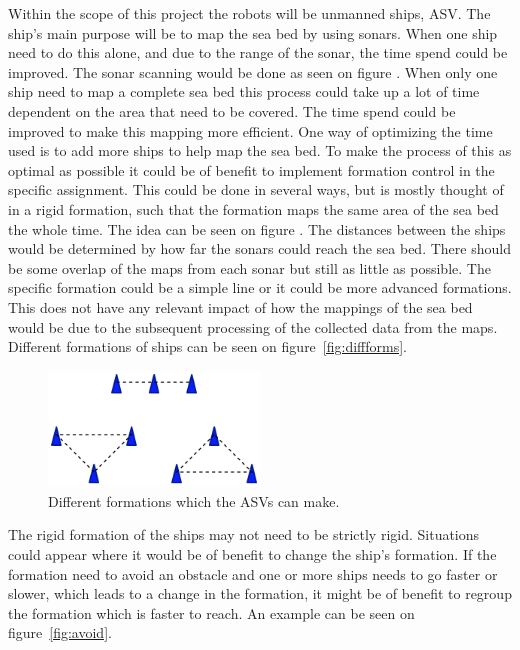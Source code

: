 Within the scope of this project the robots will be unmanned ships, \ac{ASV}. The ship's main purpose will be to map the sea bed by using sonars. When one ship need to do this alone, and due to the range of the sonar, the time spend could be improved. The sonar scanning would be done as seen on figure . When only one ship need to map a complete sea bed this process could take up a lot of time dependent on the area that need to be covered. The time spend could be improved to make this mapping more efficient. One way of optimizing the time used is to add more ships to help map the sea bed. To make the process of this as optimal as possible it could be of benefit to implement formation control in the specific assignment. This could be done in several ways, but is mostly thought of in a rigid formation, such that the formation maps the same area of the sea bed the whole time. The idea can be seen on figure . The distances between the ships would be determined by how far the sonars could reach the sea bed. There should be some overlap of the maps from each sonar but still as little as possible. The specific formation could be a simple line or it could be more advanced formations. This does not have any relevant impact of how the mappings of the sea bed would be due to the subsequent processing of the collected data from the maps. Different formations of ships can be seen on figure~\vref{fig:diffforms}.
\begin{figure}[htbp]
	\centering
	\includegraphics[width=0.5\textwidth]{fig/diffforms}
	\caption{Different formations which the \ac{ASV}s can make.}
	\label{fig:diffforms}
\end{figure}
The rigid formation of the ships may not need to be strictly rigid. Situations could appear where it would be of benefit to change the ship's formation. If the formation need to avoid an obstacle and one or more ships needs to go faster or slower, which leads to a change in the formation, it might be of benefit to regroup the formation which is faster to reach. An example can be seen on figure~\vref{fig:avoid}.
